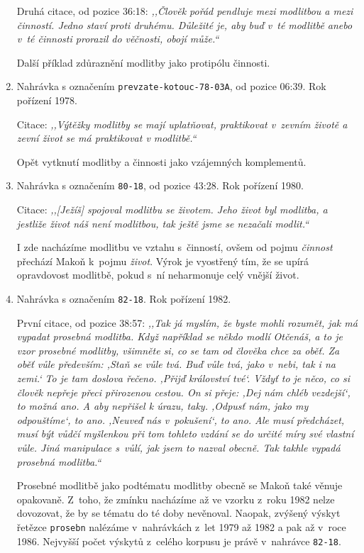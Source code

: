 \begin{enumerate}
{    Druhá citace, od pozice 36:18: \textit{%
      ,,Člověk pořád pendluje mezi modlitbou a mezi činností. Jedno staví proti
      druhému. Důležité je, aby buď v~té modlitbě anebo v~té činnosti prorazil
      do věčnosti, obojí může.``
    }

    Další příklad zdůraznění modlitby jako protipólu činnosti.
  }
  \item{
    Nahrávka s označením \texttt{prevzate-kotouc-78-03A}, od pozice 06:39.
    Rok pořízení 1978.

    Citace: \textit{%
      ,,Výtěžky modlitby se mají uplatňovat, praktikovat v~zevním životě a zevní
      život se má praktikovat v modlitbě.``
    }

    Opět vytknutí modlitby a činnosti jako vzájemných komplementů.
  }
  \item{
    Nahrávka s označením \texttt{80-18}, od pozice 43:28.
    Rok pořízení 1980.

    Citace: \textit{%
      ,,[Ježíš] spojoval modlitbu se životem. Jeho život byl modlitba, a jestli\-že
      život náš není modlitbou, tak ještě jsme se nezačali modlit.``
    }

    I zde nacházíme modlitbu ve vztahu s~činností, ovšem od pojmu
    \textit{činnost} přechází Makoň k~pojmu \textit{život}. Výrok je vyostřený
    tím, že se upírá opravdovost modlitbě, pokud s~ní neharmonuje celý vnější
    život.
  }
  \item{
    Nahrávka s označením \texttt{82-18}.
    Rok pořízení 1982.

    První citace, od pozice 38:57: \textit{%
      ,,Tak já myslím, že byste mohli rozumět, jak má vypadat prosebná modlitba.
      Když například se někdo modlí Otčenáš, a to je vzor prosebné modlitby,
      všimněte si, co se tam od člověka chce za oběť. Za oběť vůle především:
      ,Staň se vůle tvá. Buď vůle tvá, jako v~nebi, tak i na zemi.` To je tam
      doslova řečeno. ,Přijď království tvé`. Vždyť to je něco, co si člověk
      nepřeje přeci přirozenou cestou. On si přeje: ,Dej nám chléb vezdejší`,
      to možná ano. A aby nepřišel k úrazu, taky. ,Odpusť nám, jako my
      odpouštíme`, to ano. ,Neuveď nás v~pokušení`, to ano. Ale musí
      předcházet, musí být vůdčí myšlenkou při tom tohleto vzdání se do určité
      míry své vlastní vůle. Jiná manipulace s~vůlí, jak jsem to nazval obecně.
      Tak takhle vypadá prosebná modlitba.``
    }

    Prosebné modlitbě jako podtématu modlitby obecně se Makoň také věnuje
    opakovaně. Z~toho, že zmínku nacházíme až ve vzorku z~roku 1982 nelze
    dovozovat, že by se tématu do té doby nevěnoval. Naopak, zvýšený výskyt
    řetězce \texttt{prosebn} nalézáme v~nahrávkách z~let 1979 až 1982 a pak až
    v~roce 1986. Nejvyšší počet výskytů z~celého korpusu je právě v~nahrávce
    \texttt{82-18}.

}
\end{enumerate}
